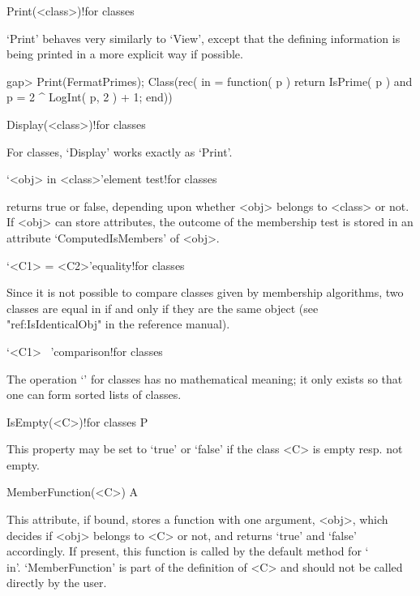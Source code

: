 \>Print(<class>)!{for classes}

`Print' behaves very similarly to `View', except that the defining
information is being printed in a more explicit way if possible.

\begintt
gap> Print(FermatPrimes);
Class(rec( in = function( p )
    return IsPrime( p ) and p = 2 ^ LogInt( p, 2 ) + 1;
end))
\endtt


\>Display(<class>)!{for classes}

For classes, `Display' works exactly as `Print'.


\>`<obj> in <class>'{element test!for classes}

\relax
{}\relax
returns true or false, depending upon whether <obj> belongs to <class> or
not. If <obj> can store attributes, the outcome of the membership test is
stored in an attribute `ComputedIsMembers' of <obj>.

\>`<C1> = <C2>'{equality!for classes}

Since it is not possible to compare classes given by membership algorithms,
two classes are equal in {\GAP} if and only if they are the same {\GAP}
object (see "ref:IsIdenticalObj" in the {\GAP} reference manual).

\>`<C1> \<\ <C2>'{comparison!for classes}

The operation `\<' for classes has no mathematical meaning; it only exists
so that one can form sorted lists of classes.


\null


\>IsEmpty(<C>)!{for classes} P

This property may be set to `true' or `false' if the class <C> is empty
resp. not empty.

\>MemberFunction(<C>) A

This attribute, if bound, stores a function with one argument, <obj>,
which decides if <obj> belongs to <C> or not, and returns `true' and `false' accordingly.
If present, this function is called by the default method for `\\in'.
`MemberFunction' is part of the definition of <C> and should not be called 
directly by the user.



\null


